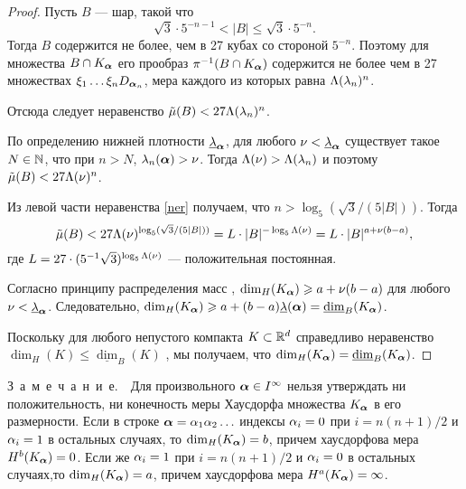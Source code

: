\begin{proof}
Пусть $B$ --- шар, такой что
\begin{equation}\label{ner}{\sqrt{3}}\cdot 5^{-n-1}<|B|\le{\sqrt{3}}\cdot 5^{-n}.
\end{equation}
Тогда $B$ содержится не более, чем в 27 кубах со стороной $5^{-n}$. Поэтому для множества $B\cap K_{\bm{\alpha}}$  его прообраз $\pi^{-1}(B\cap K_{\bm{\alpha}})$ содержится не более чем в 27 множествах  $\xi_1\ldots \xi_n D_{{\bm{\alpha}}_n}$, мера каждого из которых равна $\Lambda(\lambda_n)^n$.

Отсюда следует неравенство $\tilde\mu(B)<27\Lambda(\lambda_n)^n$.

По определению нижней плотности $\underline{\lambda}_{\bm{\alpha}}$, для любого
$\nu<\underline{\lambda}_{\bm{\alpha}}$ существует такое $N\in\mathbb{N}$, что при $n>N$, $\lambda_n({\bm{\alpha}}) > \nu$. Тогда $\Lambda(\nu)>\Lambda(\lambda_n)$  и поэтому
 $\tilde\mu(B)<27\Lambda(\nu)^n$.

 Из левой части неравенства \eqref{ner} получаем, что $n>\log_5(\sqrt{3}/(5|B|))$.
Тогда 
\begin{equation}
\tilde\mu(B)<27 \Lambda(\nu)^{\log_5(\sqrt{3}/(5|B|))}=L\cdot|B|^{-\log_5{\Lambda(\nu)}} =L\cdot |B|^{a+\nu(b-a)},
\end{equation}
где $L=27\cdot(5^{-1}\sqrt{3})^{\log_5{\Lambda(\nu)}}$ --- положительная постоянная.

Согласно принципу распределения масс \cite[Mass distribution Principle~4.2, p.55]{Fal}, $\dim_H(K_{\bm{\alpha}})\geqslant a+\nu(b-a)$ для любого $\nu<\underline{\lambda}_{\bm{\alpha}}$.
Следовательно, $\dim_H(K_{\bm{\alpha}})\geqslant  a+(b-a)\underline{\lambda}({\bm{\alpha}}) =\underline{\dim}_B(K_{\bm{\alpha}})$.

Поскольку  для любого непустого компакта $K\subset\mathbb{R}^d$ справедливо неравенство $\dim_H(K)\leqslant\underline{\dim}_B(K)$ \cite[(3.17), p.~43]{Fal}, мы получаем, что $\dim_H( K_{\bm{\alpha}})=\underline{\dim}_B( K_{\bm{\alpha}})$.
\end{proof}

\mbox{З\ а\ м\ е\ ч\ а\ н\ и\ е.}\ \  Для произвольного ${\bm{\alpha}}\in I^\infty$ нельзя утверждать ни положительность, ни конечность меры Хаусдорфа множества $K_{\bm{\alpha}}$ в его размерности. Если в строке ${\bm{\alpha}}=\alpha_1\alpha_2\ldots$ индексы $\alpha_i=0$ при  $i=n(n+1)/2$ и $\alpha_i=1$ в остальных случаях, то $\dim_H(K_{\bm{\alpha}})=b$, причем хаусдорфова мера $H^b(K_{\bm{\alpha}})=0$.
 Если же $\alpha_i=1$ при  $i=n(n+1)/2$ и $\alpha_i=0$ в остальных случаях,то $\dim_H(K_{\bm{\alpha}})=a$, причем хаусдорфова мера $H^a(K_{\bm{\alpha}})=\infty$.